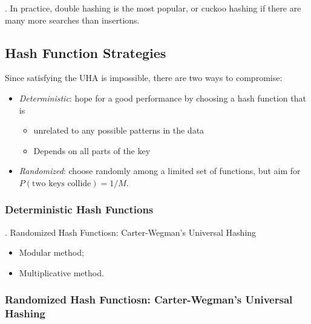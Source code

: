 \documentclass{article}
\begin{document}
\begin{comm}[].
    In practice, double hashing is the most popular, or cuckoo hashing if there are many more searches than insertions. 
\end{comm}

\subsection{Hash Function Strategies} 

Since satisfying the UHA is impossible, there are two ways to compromise: 
\begin{itemize}
    \item \textit{Deterministic}: hope for a good performance by choosing a hash function that is \begin{itemize}
        \item unrelated to any possible patterns in the data 
        \item Depends on all parts of the key
    \end{itemize}
    \item \textit{Randomized}: choose randomly among a limited set of functions, but aim for $P(\text{two keys collide}) = 1/M$. 
\end{itemize}

\subsubsection{Deterministic Hash Functions} 

\begin{algo}[].
    Randomized Hash Functiosn: Carter-Wegman’s Universal Hashing 
    \begin{itemize}
        \item Modular method; 
        \item Multiplicative method. 
    \end{itemize}
\end{algo}

\subsubsection{Randomized Hash Functiosn: Carter-Wegman’s Universal Hashing}
\end{document}
